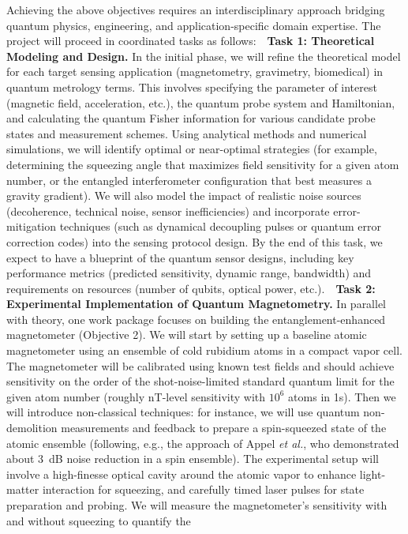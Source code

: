 \documentclass[12pt]{article}
\begin{document}
Achieving the above objectives requires an interdisciplinary approach
bridging quantum physics, engineering, and application-specific domain
expertise. The project will proceed in coordinated tasks as follows:  
\textbf{Task 1: Theoretical Modeling and Design.} In the initial
phase, we will refine the theoretical model for each target sensing
application (magnetometry, gravimetry, biomedical) in quantum
metrology terms. This involves specifying the parameter of interest
(magnetic field, acceleration, etc.), the quantum probe system and
Hamiltonian, and calculating the quantum Fisher information for
various candidate probe states and measurement schemes. Using
analytical methods and numerical simulations, we will identify optimal
or near-optimal strategies (for example, determining the squeezing
angle that maximizes field sensitivity for a given atom number, or the
entangled interferometer configuration that best measures a gravity
gradient). We will also model the impact of realistic noise sources
(decoherence, technical noise, sensor inefficiencies) and incorporate
error-mitigation techniques (such as dynamical decoupling pulses or
quantum error correction codes) into the sensing protocol design. By
the end of this task, we expect to have a blueprint of the quantum
sensor designs, including key performance metrics (predicted
sensitivity, dynamic range, bandwidth) and requirements on resources
(number of qubits, optical power, etc.).    \textbf{Task 2:
  Experimental Implementation of Quantum Magnetometry.} In parallel
with theory, one work package focuses on building the
entanglement-enhanced magnetometer (Objective 2). We will start by
setting up a baseline atomic magnetometer using an ensemble of cold
rubidium atoms in a compact vapor cell. The magnetometer will be
calibrated using known test fields and should achieve sensitivity on
the order of the shot-noise-limited standard quantum limit for the
given atom number (roughly nT-level sensitivity with $10^6$ atoms in
1s). Then we will introduce non-classical techniques: for instance, we
will use quantum non-demolition measurements and feedback to prepare a
spin-squeezed state of the atomic ensemble (following, e.g., the
approach of Appel \textit{et al.}\cite{Appel2009}, who demonstrated
about 3~dB noise reduction in a spin ensemble). The experimental setup
will involve a high-finesse optical cavity around the atomic vapor to
enhance light-matter interaction for squeezing, and carefully timed
laser pulses for state preparation and probing. We will measure the
magnetometer’s sensitivity with and without squeezing to quantify the
\end{document}
